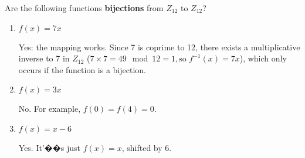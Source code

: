 \question Are the following functions \textbf{bijections} from 
$Z_{12}$ to $Z_{12}$?
\begin{enumerate}[label=\alph*.]
\item $f(x) = 7x$
\begin{solution}[0.15 in]
Yes: the mapping works. Since 7 is coprime to 12, there exists a 
multiplicative inverse to 7 in $Z_{12}$ ($7 \times 7 = 49 \mod 12 = 1, 
\text{so } f^{-1}(x) = 7x$), which only occurs if the function is a bijection.
\end{solution}
\item $f(x) = 3x$
\begin{solution}[0.15 in]
 No. For example, $f(0) = f(4) = 0. $
\end{solution}
\item $f(x) = x - 6$
\begin{solution}[0.15 in]
Yes. It'��s just $f(x) = x$, shifted by 6. 
\end{solution}
\end{enumerate}